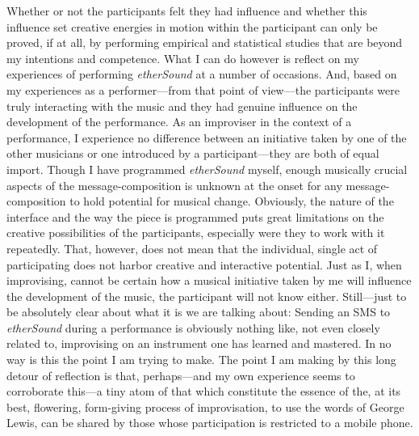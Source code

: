 Whether or not the participants felt they had influence and whether this influence set creative energies in motion within the participant can only be proved, if at all, by performing empirical and statistical studies that are beyond my intentions and competence. What I can do however is reflect on my experiences of performing \emph{etherSound} at a number of occasions. And, based on my experiences as a performer---from that point of view---the participants were truly interacting with the music and they had genuine influence on the development of the performance. As an improviser in the context of a performance, I experience no difference between an initiative taken by one of the other musicians or one introduced by a participant---they are both of equal import. 
Though I have programmed \emph{etherSound} myself, enough musically crucial aspects of the message-composition is unknown at the onset for any message-composition to hold potential for musical change. Obviously, the nature of the interface and the way the piece is programmed puts great limitations on the creative possibilities of the participants, especially were they to work with it repeatedly. That, however, does not mean that the individual, single act of participating does not harbor creative and interactive potential. Just as I, when improvising, cannot be certain how a musical initiative taken by me will influence the development of the music, the participant will not know either. 
Still---just to be absolutely clear about what it is we are talking about: Sending an SMS to \emph{etherSound} during a performance is obviously nothing like, not even closely related to, improvising on an instrument one has learned and mastered. In no way is this the point I am trying to make. The point I am making by this long detour of reflection is that, perhaps---and my own experience seems to corroborate this---a tiny atom of that which constitute the essence of the, at its best, flowering, form-giving process of improvisation, to use the words of George Lewis, can be shared by those whose participation is restricted to a mobile phone.

